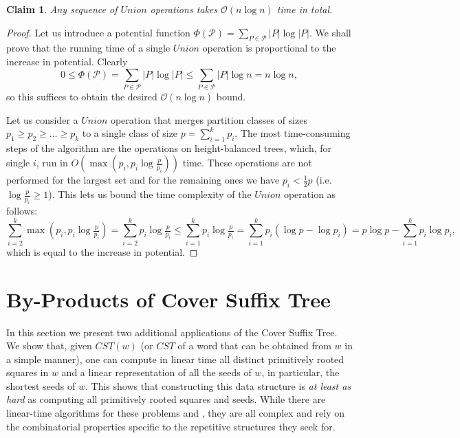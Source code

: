 \documentclass{article}
\theoremstyle{theorem}
\newtheorem{claim}[theorem]{Claim}
\theoremstyle{definition}
\newcommand{\CST}{\mathit{CST}}
\newcommand{\Oh}{\mathcal{O}}
\newcommand{\PP}{\mathcal{P}}
\newcommand{\union}{\mathit{Union}}
\begin{document}
  \begin{claim}
    Any sequence of $\union$ operations takes $\Oh(n\log n)$ time in total.
  \end{claim}
  \begin{proof}
    Let us introduce a potential function $\Phi(\PP) = \sum_{P\in \PP} |P|\log |P|$.
    We shall prove that the running time of a single $\union$ operation
    is proportional to the increase in potential.
    Clearly 
    $$ 0 \le \Phi(\PP) = \sum_{P\in \PP} |P|\log |P| \le \sum_{P\in \PP} |P|\log n
    = n\log n,$$
    so this suffices to obtain the desired $\Oh(n\log n)$ bound.
    
    Let us consider a $\union$ operation that merges partition classes of sizes
    $p_1\ge p_2 \ge \ldots \ge p_k$ to a single class of size $p = \sum_{i=1}^k
    p_i$.
    The most time-consuming steps of the algorithm are the operations on
    height-balanced trees, which, for single $i$, run in $O\left(\max\left(p_i,
    p_i\log\tfrac{p}{p_i}\right)\right)$ time. 
    These operations are not performed
    for the largest set and for the remaining ones we have $p_i < \frac{1}{2} p$
    (i.e. $\log{\frac{p}{p_i}}\ge 1$). This lets us bound the time complexity
    of the $\union$ operation as follows:
    $$\sum_{i=2}^k
    \max\left(p_i, p_i\log\tfrac{p}{p_i}\right) = \sum_{i=2}^k
    p_i\log\tfrac{p}{p_i} \le \sum_{i=1}^k p_i\log\tfrac{p}{p_i} = 
    \sum_{i=1}^k p_i(\log p - \log p_i)  = p\log p - \sum_{i=1}^k p_i\log p_i,$$
    which is equal to the increase in potential.
  \end{proof}




  \section{By-Products of Cover Suffix Tree}\label{sec:by-products}
  In this section we present two additional applications of the Cover Suffix Tree.
  We show that, given $\CST(w)$ (or $\CST$ of a word that can be obtained from $w$
  in a simple manner), one can compute in linear time all distinct primitively rooted squares
  in $w$ and a linear representation of all the seeds of $w$, in particular, the shortest
  seeds of $w$.
  This shows that constructing this data structure is \emph{at least as hard}
  as computing all primitively rooted squares and seeds. While there are linear-time algorithms
  for these problems \cite{DBLP:journals/jcss/GusfieldS04,DBLP:conf/focs/KolpakovK99,Crochemore2013} and \cite{DBLP:conf/soda/KociumakaKRRW12}, they
  are all complex and rely on the combinatorial properties specific to the repetitive structures they seek for.
  
\end{document}
